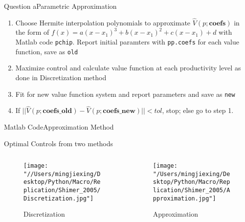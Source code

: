 \documentclass{beamer}
\begin{document}
\begin{frame}{Question a}{Parametric Approximation}
    \begin{enumerate}\addtocounter{enumi}{-1}
        \item Choose Hermite interpolation polynomials to approximate $\hat{V}(p;\textbf{coefs})$ in the form of \(
            f(x) = a (x-x_1)^3 + b(x-x_1)^2 + c(x-x_1)+d 
            \) with Matlab code \texttt{pchip}. Report initial paramters with \texttt{pp.coefs} for each value function, save as \texttt{old}
        \item Maximize control and calculate value function at each productivity level as done in Discretization method
        \item Fit for new value function system and report parameters and save as \texttt{new}
        \item If \(||\hat{V}(p;\textbf{coefs\_old})-\hat{V}(p;\textbf{coefs\_new})||<tol\), stop; else go to step 1.
    \end{enumerate}
\end{frame}

\begin{frame}[allowframebreaks]{Matlab Code}{Approximation Method}
    
\end{frame}

\begin{frame}{Optimal Controls from two methods}
    \begin{columns}[c]
            \begin{column}{.6\textwidth}
            \begin{figure}
                \centering
                \texttt{[image: "//Users/mingjiexing/Desktop/Python/Macro/Replication/Shimer\_2005/Discretization.jpg"]}
                \caption{Discretization}
            \end{figure}      
            \end{column}
            \begin{column}{.6\textwidth}
            \begin{figure}
                \centering
                \texttt{[image: "/Users/mingjiexing/Desktop/Python/Macro/Replication/Shimer\_2005/Approximation.jpg"]}
                \caption{Approximation}
            \end{figure}
            \end{column}
        \end{columns}
\end{frame}
\end{document}
